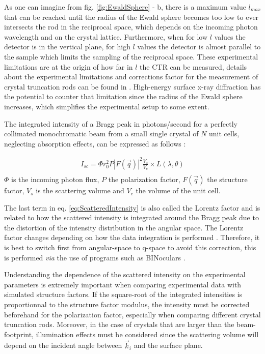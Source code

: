 As one can imagine from fig. \ref{fig:EwaldSphere} - b, there is a maximum value $l_{max}$ that can be reached until the radius of the Ewald sphere becomes too low to ever intersects the rod in the reciprocal space, which depends on the incoming photon wavelength and on the crystal lattice.
Furthermore, when for low $l$ values the detector is in the vertical plane, for high $l$ values the detector is almost parallel to the sample which limits the sampling of the reciprocal space.
These experimental limitations are at the origin of how far in $l$ the CTR can be measured, details about the experimental limitations and corrections factor for the measurement of crystal truncation rods can be found in \cite{Vlieg1997, Drnec2014}.
High-energy surface x-ray diffraction \parencite{Gustafson2014, Harlow2020, Hejral2021} has the potential to counter that limitation since the radius of the Ewald sphere increases, which simplifies the experimental setup to some extent.

The integrated intensity of a Bragg peak in photons/second for a perfectly collimated monochromatic beam from a small single crystal of $N$ unit cells, neglecting absorption effects, can be expressed as follows \parencite{NielsenMcMorrow}:

\begin{gather}
    \label{eq:ScatteredIntensity}
    I_{sc} = \Phi r_0^2 P |F(\vec{q})|^2 \frac{V_s}{V_c} \times L(\lambda, \theta)\\
\end{gather}
$\Phi$ is the incoming photon flux, $P$ the polarization factor, $F(\vec{q})$ the structure factor, $V_s$ is the scattering volume and $V_c$ the volume of the unit cell.

The last term in eq. \ref{eq:ScatteredIntensity} is also called the Lorentz factor and is related to how the scattered intensity is integrated around the Bragg peak due to the distortion of the intensity distribution in the angular space.
The Lorentz factor changes depending on how the data integration is performed \parencite{Robach2000, Drnec2014}.
Therefore, it is best to switch first from angular-space to q-space to avoid this correction, this is performed \textit{via} the use of programs such as BINoculars \parencite{Roobol2015}.

Understanding the dependence of the scattered intensity on the experimental parameters is extremely important when comparing experimental data with simulated structure factors.
If the square-root of the integrated intensities is proportionnal to the structure factor modulus, the intensity must be corrected beforehand for the polarization factor, especially when comparing different crystal truncation rods.
Moreover, in the case of crystals that are larger than the beam-footprint, illumination effects must be considered since the scattering volume will depend on the incident angle between $\vec{k}_i$ and the surface plane.

